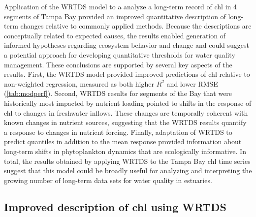 \documentclass{svjour3}\usepackage[]{graphicx}\usepackage[]{color}
\begin{document}
Application of the \acf{WRTDS} model to a analyze a long-term record of \ac{chl} in 4 segments of Tampa Bay provided an improved quantitative description of long-term changes relative to commonly applied methods.  Because the descriptions are conceptually related to expected causes, the results enabled generation of informed hypotheses regarding ecosystem behavior and change and could suggest a potential approach for developing quantitative thresholds for water quality management.   These conclusions are supported by several key aspects of the results.  First, the \ac{WRTDS} model provided improved predictions of \ac{chl} relative to non-weighted regression, measured as both higher $R^2$ and lower \ac{RMSE} (\cref{tab:modperf}).  Second, \ac{WRTDS} results for segments of the Bay that were historically most impacted by nutrient loading pointed to shifts in the response of \ac{chl} to changes in freshwater inflows.  These changes are temporally coherent with known changes in nutrient sources, suggesting that the \ac{WRTDS} results quantify a response to changes in nutrient forcing.  Finally, adaptation of \ac{WRTDS} to predict quantiles in addition to the mean response provided information about long-term shifts in phytoplankton dynamics that are ecologically informative.  In total, the results obtained by applying \ac{WRTDS} to the Tampa Bay \ac{chl} time series suggest that this model could be broadly useful for analyzing and interpreting the growing number of long-term data sets for water quality in estuaries.

\subsection{Improved description of \ac{chl} using \ac{WRTDS}}
\end{document}
